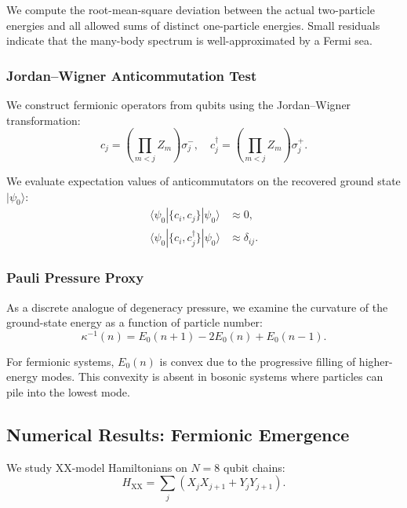 \documentclass[11pt]{article}
\begin{document}
We compute the root-mean-square deviation between the actual two-particle energies and all allowed sums of distinct one-particle energies. Small residuals indicate that the many-body spectrum is well-approximated by a Fermi sea.

\subsubsection{Jordan--Wigner Anticommutation Test}

We construct fermionic operators from qubits using the Jordan--Wigner transformation:
\begin{equation}
c_j = \left( \prod_{m<j} Z_m \right) \sigma^-_j, \quad
c_j^\dagger = \left( \prod_{m<j} Z_m \right) \sigma^+_j.
\end{equation}

We evaluate expectation values of anticommutators on the recovered ground state $|\psi_0\rangle$:
\begin{align}
\langle \psi_0 | \{c_i, c_j\} | \psi_0 \rangle &\approx 0, \\
\langle \psi_0 | \{c_i, c_j^\dagger\} | \psi_0 \rangle &\approx \delta_{ij}.
\end{align}

\subsubsection{Pauli Pressure Proxy}

As a discrete analogue of degeneracy pressure, we examine the curvature of the ground-state energy as a function of particle number:
\begin{equation}
\kappa^{-1}(n) = E_0(n+1) - 2E_0(n) + E_0(n-1).
\end{equation}

For fermionic systems, $E_0(n)$ is convex due to the progressive filling of higher-energy modes. This convexity is absent in bosonic systems where particles can pile into the lowest mode.

\subsection{Numerical Results: Fermionic Emergence}

We study XX-model Hamiltonians on $N=8$ qubit chains:
\begin{equation}
H_{\text{XX}} = \sum_j \left( X_j X_{j+1} + Y_j Y_{j+1} \right).
\end{equation}
\end{document}
